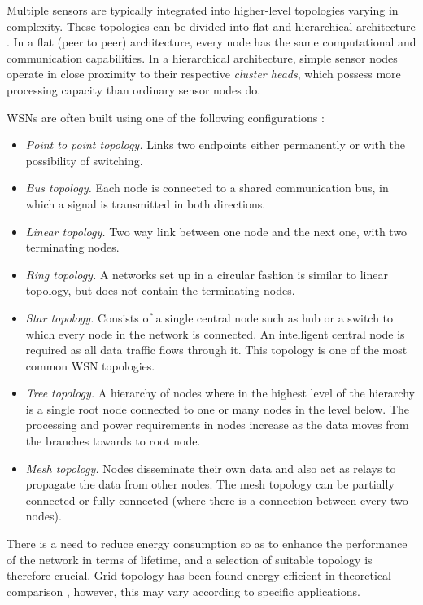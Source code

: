 Multiple sensors are typically integrated into higher-level topologies varying in complexity.
These topologies can be divided into flat and hierarchical architecture \cite{mcgrath13}.
In a flat (peer to peer) architecture, every node has the same computational and communication capabilities.
In a hierarchical architecture, simple sensor nodes operate in close proximity to their respective \emph{cluster heads},
which possess more processing capacity than ordinary sensor nodes do.

WSNs are often built using one of the following configurations \cite{mcgrath13}:

\begin{itemize}
\item \emph{Point to point topology.} Links two endpoints either permanently or with the possibility of switching.
\item \emph{Bus topology.} Each node is connected to a shared communication bus, in which a signal is transmitted in both directions. 
\item \emph{Linear topology.} Two way link between one node and the next one, with two terminating nodes.
\item \emph{Ring topology.} A networks set up in a circular fashion is similar to linear topology, but does not contain the terminating nodes.
\item \emph{Star topology.} Consists of a single central node such as hub or a switch to which every node in the network is connected. 
An intelligent central node is required as all data traffic flows through it.
This topology is one of the most common WSN topologies.
\item \emph{Tree topology.} A hierarchy of nodes where in the highest level of the hierarchy is a single root node connected to one or many nodes in the level below.
The processing and power requirements in nodes increase as the data moves from the branches towards to root node.
\item \emph{Mesh topology.} Nodes disseminate their own data and also act as relays to propagate the data from other nodes.
The mesh topology can be partially connected  or fully connected (where there is a connection between every two nodes).
\end{itemize}
There is a need to reduce energy consumption so as to enhance the performance of the network in terms of lifetime, and a selection of suitable topology is therefore crucial.
Grid topology has been found energy efficient in theoretical comparison \cite{sharma13}, however, this may vary according to specific applications.

